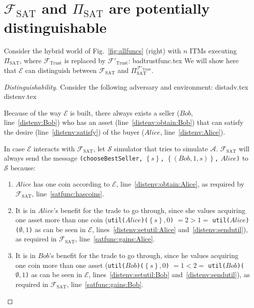 \section{$\mathcal{F}_{\mathrm{SAT}}$ and $\Pi_{\mathrm{SAT}}$ are potentially
distinguishable}
  Consider the hybrid world of Fig.~\ref{fig:allfuncs} (right) with $n$ ITMs executing
  $\Pi_{\mathrm{SAT}}$, where $\mathcal{F}_{\mathrm{Trust}}$ is replaced by
  $\mathcal{F}'_{\mathrm{Trust}}$:
  {badtrustfunc.tex}
  We will show here that $\mathcal{E}$ can distinguish between
  $\mathcal{F}_{\mathrm{SAT}}$ and $\Pi_{\mathrm{SAT}}^{\mathcal{F}'_{\mathrm{Trust}}}$.
  \begin{proof}[Distinguishability]
    Consider the following adversary and environment:
    {distadv.tex}
    {distenv.tex}

    Because of the way $\mathcal{E}$ is built, there always exists a seller ($Bob$,
    line~\ref{distenv:Bob}) who has an asset (line~\ref{distenv:obtain:Bob}) that can
    satisfy the desire (line~\ref{distenv:satisfy}) of the buyer ($Alice$,
    line~\ref{distenv:Alice}).

    In case $\mathcal{E}$ interacts with $\mathcal{F}_{\mathrm{SAT}}$, let $\mathcal{S}$
    simulator that tries to simulate $\mathcal{A}$. $\mathcal{F}_{\mathrm{SAT}}$ will
    always send the message \texttt{(chooseBestSeller,} $\left\{s\right\}$\texttt{,}
    $\left\{\left(Bob, 1, s\right)\right\}$\texttt{,} $Alice$\texttt{)} to $\mathcal{S}$
    because:
    \begin{enumerate}
      \item $Alice$ has one coin according to $\mathcal{E}$,
      line~\ref{distenv:obtain:Alice}, as required by $\mathcal{F}_{\textrm{SAT}}$,
      line~\ref{satfunc:hascoins}.
      \item It is in $Alice$'s benefit for the trade to go through, since she values
      acquiring one asset more than one coin
      (\texttt{util(}$Alice$\texttt{)(}$\left\{s\right\}, 0$\texttt{)} $= 2 > 1 = $
      \texttt{util(}$Alice$\texttt{)(}$\emptyset, 1$\texttt{)} as can be seen in
      $\mathcal{E}$, lines~\ref{distenv:setutil:Alice} and~\ref{distenv:sendutil}), as
      required in $\mathcal{F}_{\textrm{SAT}}$, line~\ref{satfunc:gains:Alice}.
      \item It is in $Bob$'s benefit for the trade to go through, since he values
      acquiring one coin more than one asset
      (\texttt{util(}$Bob$\texttt{)(}$\left\{s\right\}, 0$\texttt{)} $= 1 < 2 = $
      \texttt{util(}$Bob$\texttt{)(}$\emptyset, 1$\texttt{)} as can be seen in
      $\mathcal{E}$, lines~\ref{distenv:setutil:Bob} and~\ref{distenv:sendutil}), as
      required in $\mathcal{F}_{\textrm{SAT}}$, line~\ref{satfunc:gains:Bob}.
    \end{enumerate}


\end{proof}
